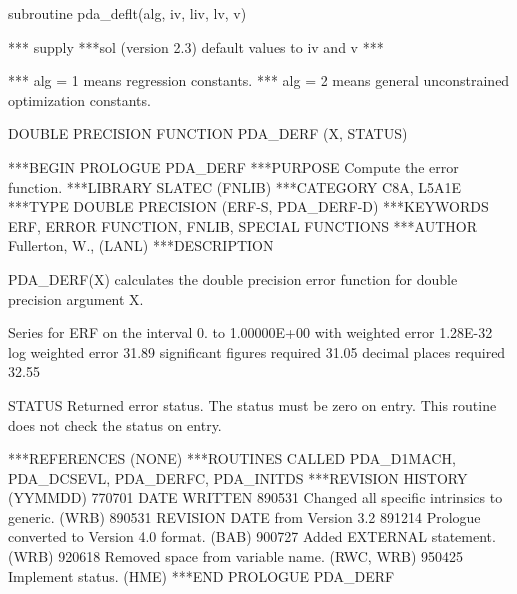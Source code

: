\documentclass[11pt,twoside,nolof]{starlink}
\begin{document}


\begin{terminalv}

      subroutine pda_deflt(alg, iv, liv, lv, v)

  ***  supply ***sol (version 2.3) default values to iv and v  ***

  ***  alg = 1 means regression constants.
  ***  alg = 2 means general unconstrained optimization constants.


\end{terminalv}





\begin{terminalv}
      DOUBLE PRECISION FUNCTION PDA_DERF (X, STATUS)


***BEGIN PROLOGUE  PDA_DERF
***PURPOSE  Compute the error function.
***LIBRARY   SLATEC (FNLIB)
***CATEGORY  C8A, L5A1E
***TYPE      DOUBLE PRECISION (ERF-S, PDA_DERF-D)
***KEYWORDS  ERF, ERROR FUNCTION, FNLIB, SPECIAL FUNCTIONS
***AUTHOR  Fullerton, W., (LANL)
***DESCRIPTION

 PDA_DERF(X) calculates the double precision error function for double
 precision argument X.

 Series for ERF        on the interval  0.          to  1.00000E+00
                                        with weighted error   1.28E-32
                                         log weighted error  31.89
                               significant figures required  31.05
                                    decimal places required  32.55

    STATUS   Returned error status.
             The status must be zero on entry. This
             routine does not check the status on entry.

***REFERENCES  (NONE)
***ROUTINES CALLED  PDA_D1MACH, PDA_DCSEVL, PDA_DERFC, PDA_INITDS
***REVISION HISTORY  (YYMMDD)
   770701  DATE WRITTEN
   890531  Changed all specific intrinsics to generic.  (WRB)
   890531  REVISION DATE from Version 3.2
   891214  Prologue converted to Version 4.0 format.  (BAB)
   900727  Added EXTERNAL statement.  (WRB)
   920618  Removed space from variable name.  (RWC, WRB)
   950425  Implement status.  (HME)
***END PROLOGUE  PDA_DERF
\end{terminalv}
\end{document}

